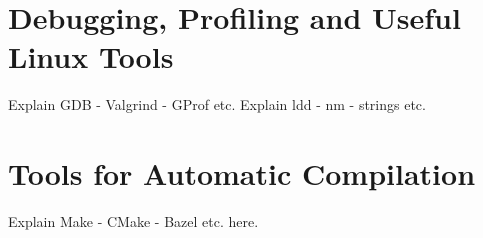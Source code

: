 \section{Debugging, Profiling and Useful Linux Tools}
Explain GDB - Valgrind - GProf etc.
\newline \newline
Explain ldd - nm - strings etc.

\section{Tools for Automatic Compilation}
Explain Make - CMake - Bazel etc. here.
